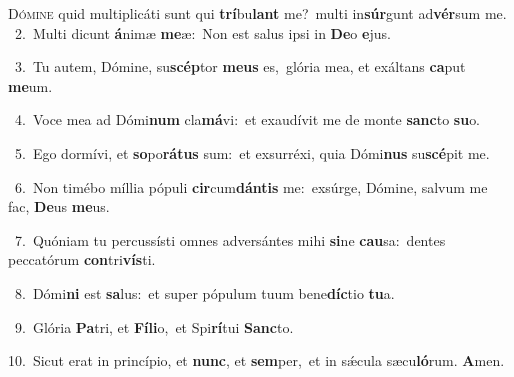 \lettrine{\initial\textcolor{\initialcolor}{D}}{ómine} quid multiplicáti sunt qui \textbf{trí}\-bu\textbf{lant} me?~\star multi in\-\textbf{súr}\-gunt ad\-\textbf{vér}\-sum me.\\
{\numbfont\textcolor{\numbcolor}{~2.}}~Multi dicunt \textbf{á}\-nimæ \textbf{me}\-æ:~\star Non est salus ipsi in \textbf{De}\-o \textbf{e}\-jus.\par
{\numbfont\textcolor{\numbcolor}{~3.}}~Tu autem, Dómine, su\-\textbf{scép}\-tor \textbf{me}\-\textbf{us} es,~\star glória mea, et exáltans \textbf{ca}\-put \textbf{me}\-um.\par
{\numbfont\textcolor{\numbcolor}{~4.}}~Voce mea ad Dómi\textbf{num} cla\-\textbf{má}\-vi:~\star et exaudívit me de monte \textbf{sanc}\-to \textbf{su}\-o.\par
{\numbfont\textcolor{\numbcolor}{~5.}}~Ego dormívi, et \textbf{so}\-po\-\textbf{rá}\-\textbf{tus} sum:~\star et exsurréxi, quia Dómi\textbf{nus} su\-\textbf{scé}\-pit me.\par
{\numbfont\textcolor{\numbcolor}{~6.}}~Non timébo míllia pópuli \textbf{cir}\-cum\-\textbf{dán}\-\textbf{tis} me:~\star exsúrge, Dómine, salvum me fac, \textbf{De}\-us \textbf{me}\-us.\par
{\numbfont\textcolor{\numbcolor}{~7.}}~Quóniam tu percussísti omnes adversántes mihi \textbf{si}\-ne \textbf{cau}\-sa:~\star dentes peccatórum \textbf{con}\-tri\-\textbf{vís}\-ti.\par
{\numbfont\textcolor{\numbcolor}{~8.}}~Dómi\textbf{ni} est \textbf{sa}\-lus:~\star et super pópulum tuum bene\-\textbf{díc}\-tio \textbf{tu}\-a.\par
{\numbfont\textcolor{\numbcolor}{~9.}}~Glória \textbf{Pa}\-tri, et \textbf{Fí}\-\textbf{li}o,~\star et Spi\-\textbf{rí}\-tui \textbf{Sanc}\-to.\par
{\numbfont\textcolor{\numbcolor}{10.}}~Sicut erat in princípio, et \textbf{nunc}\-, et \textbf{sem}\-per,~\star et in sǽcula sæcu\-\textbf{ló}\-rum. \textbf{A}\-men.\par
